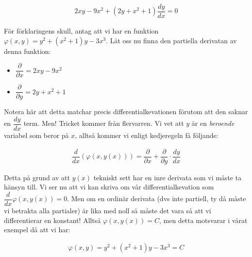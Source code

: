 \begin{equation*}
  \begin{gathered}
    2xy-9x^2+(2y+x^2+1)\dfrac{dy}{dx}=0
  \end{gathered}
\end{equation*}
\par\bigskip

\noindent För förklaringens skull, antag att vi har en funktion $\varphi(x,y) = y^2+(x^2+1)y-3x^3$. Låt oss nu finna den partiella derivatan av denna funktion:
\par\bigskip

\begin{itemize}
  \item $\dfrac{\partial}{\partial x}=2xy-9x^2$
    \par\bigskip
  \item $\dfrac{\partial}{\partial y}=2y+x^2+1$
\end{itemize}
\par\bigskip

\noindent Notera här att detta matchar precis differentialkevationen förutom att den saknar en $\dfrac{dy}{dx}$ term. Men! Tricket kommer från flervarren. Vi vet att $y$ är en \textit{beroende} variabel som beror på $x$, alltså kommer vi enligt kedjeregeln få följande:


\begin{equation*}
  \begin{gathered}
    \dfrac{d}{dx}(\varphi(x,y(x)))=\dfrac{\partial}{\partial x}+\dfrac{\partial}{\partial y}\cdot\dfrac{dy}{dx}
  \end{gathered}
\end{equation*}
\par\bigskip

\noindent Detta på grund av att $y(x)$ tekniskt sett har en inre derivata som vi måste ta hänsyn till. Vi ser nu att vi kan skriva om vår differentialkevation som $\dfrac{d}{dx}\varphi(x,y(x))=0$. Men om en ordinär derivata (dvs inte partiell, ty då måste vi betrakta alla partialer) är lika med noll så måste det vara så att vi differentierar en konstant! Alltså $\varphi(x,y(x))=C$, men detta motsvarar i vårat exempel då att vi har:

\begin{equation*}
  \begin{gathered}
    \varphi(x,y) = y^2+(x^2+1)y-3x^3 = C
  \end{gathered}
\end{equation*}
\par\bigskip

